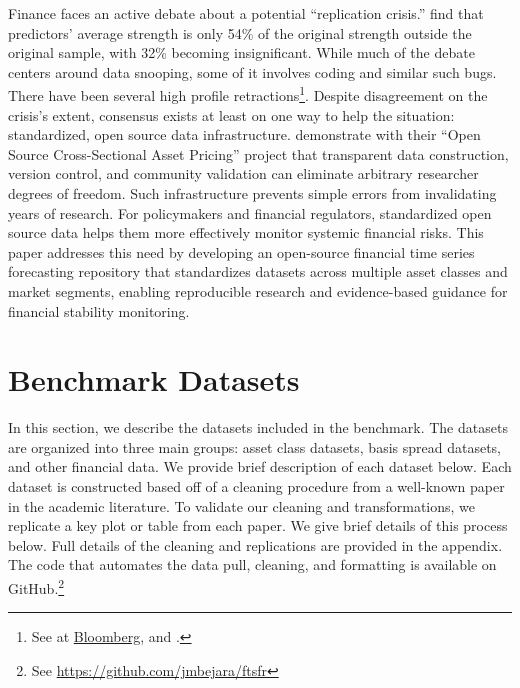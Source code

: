 \documentclass{article}
\begin{document}
Finance faces an active debate about a potential ``replication crisis.'' \cite{Jensen2023} find that predictors' average strength is only 54\% of the original strength outside the original sample, with 32\% becoming insignificant. While much of the debate centers around data snooping, some of it involves
coding and similar such bugs. There have been several high profile retractions\footnote{See  \cite{Lee2023} at \href{https://www.bloomberg.com/news/articles/2023-12-01/a-grad-school-number-cruncher-shakes-up-the-world-of-bond-quants}{Bloomberg}, and \cite{Dickerson2024}.}.
Despite disagreement on the crisis's extent, consensus exists at least on one way to help the situation: standardized, open source data infrastructure. \cite{Chen2022} demonstrate with their ``Open Source Cross-Sectional Asset Pricing'' project that transparent data construction, version control, and community validation can eliminate arbitrary researcher degrees of freedom. Such infrastructure prevents simple errors from invalidating years of research. For policymakers and financial regulators, standardized open source data 
helps them more effectively monitor systemic financial risks. This paper addresses this need by developing an open-source financial time series forecasting repository that standardizes datasets across multiple asset classes and market segments, enabling reproducible research and evidence-based guidance for financial stability monitoring.


\section{Benchmark Datasets}

In this section, we describe the datasets included in the benchmark. The datasets are organized into three main groups: asset class datasets, basis spread datasets, and other financial data. We provide brief description of each dataset below. Each dataset is constructed based off of a cleaning procedure from a well-known paper in the academic literature. To validate our cleaning and transformations, we replicate a key plot or table from each paper. We give brief details of this process below. Full details of the cleaning and replications are provided in the appendix.
The code that automates the data pull, cleaning, and formatting is available on GitHub.\footnote{See \url{https://github.com/jmbejara/ftsfr}}
\end{document}
